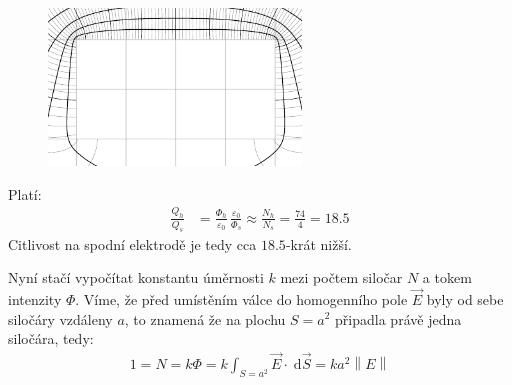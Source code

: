 \documentclass[10pt,a4paper]{article}
\newcommand{\const}[1]{\text{#1}}
\newcommand{\norm}[1]{\left\lVert#1\right\rVert}
\renewcommand{\d}[1]{\;\const{d}#1}
\begin{document}
\begin{figure}[h!]
    \centering
    \includegraphics[width=0.6\textwidth]{uloha3_detail.pdf}
\end{figure}

Platí:
\begin{align*}
    \frac{Q_h}{Q_s} &= \frac{\Phi_h}{\varepsilon_0} \, \frac{\varepsilon_0}{\Phi_s} \approx \frac{N_h}{N_s} = \frac{74}{4} = 18.5
\end{align*}
Citlivost na spodní elektrodě je tedy cca $18.5$-krát nižší.

Nyní stačí vypočítat konstantu úměrnosti $k$ mezi počtem siločar $N$ a tokem intenzity $\Phi$. Víme, že před umístěním válce do homogenního pole $\vec{E}$ byly od sebe siločáry vzdáleny $a$, to znamená že na plochu $S=a^2$ připadla právě jedna siločára, tedy:
\begin{align*}
    1 = N = k\Phi = k\int_{S=a^2} \vec{E} \cdot \d{\vec{S}} = k a^2 \norm{E}
\end{align*}
\end{document}

